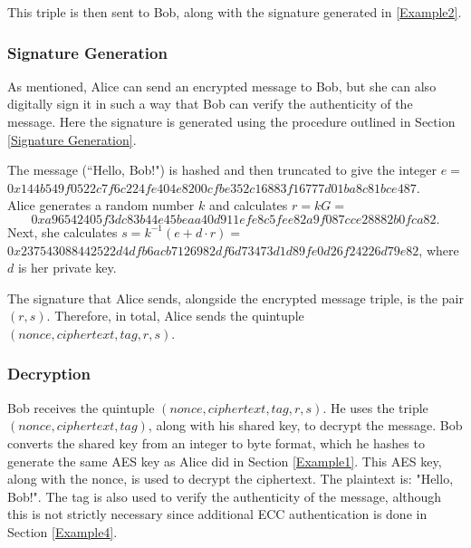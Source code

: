 \documentclass[12pt,a4paper]{article}
\begin{document}
\vspace{1mm}

This triple is then sent to Bob, along with the signature generated in \ref{Example2}. 


\subsubsection{Signature Generation} \noindent \label{Example2}
As mentioned, Alice can send an encrypted message to Bob, 
but she can also digitally sign it in such a way that Bob can verify the authenticity of the message. 
Here the signature is generated using the procedure outlined in Section \ref{Signature Generation}. 

The message (``Hello, Bob!") is hashed and then truncated to give the integer $e =$ \\
{\footnotesize $0x144b549f0522c7f6c224fe404e8200cfbe352c16883f16777d01ba8c81bce487$}. \\
Alice generates a random number $k$ and calculates $r = kG =$ 
\begin{equation} \label{AliceSig}
    0xa96542405f3dc83b44e45beaa40d911efe8c5fee82a9f087cce28882b0fca82.
\end{equation}
Next, she calculates $s = k^{-1}(e + d \cdot r) =$ \\
{\footnotesize $0x237543088442522d4dfb6acb7126982df6d73473d1d89fe0d26f24226d79e82$}, where $d$ is her private key. 

The signature that Alice sends, alongside the encrypted message triple, is the pair $(r,s)$. 
Therefore, in total, Alice sends the quintuple $(nonce, ciphertext, tag, r, s)$. 


\subsubsection{Decryption} \noindent \label{Example3}
Bob receives the quintuple $(nonce, ciphertext, tag, r, s)$. 
He uses the triple $(nonce, ciphertext, tag)$, along with his shared key, to decrypt the message. 
Bob converts the shared key from an integer to byte format, which he hashes to generate the same AES key as Alice did in Section \ref{Example1}. 
This AES key, along with the nonce, is used to decrypt the ciphertext. 
The plaintext is: "Hello, Bob!". 
The tag is also used to verify the authenticity of the message, 
although this is not strictly necessary since additional ECC authentication is done in Section \ref{Example4}. 
\end{document}
